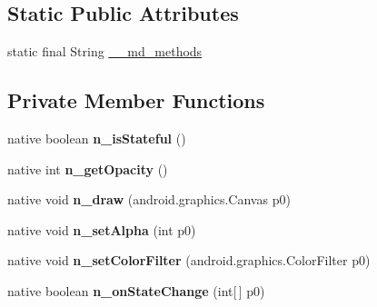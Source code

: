 \subsection*{Static Public Attributes}
\begin{DoxyCompactItemize}
\item 
static final String \hyperlink{classmd5b60ffeb829f638581ab2bb9b1a7f4f3f_1_1FrameRenderer__FrameDrawable_acfbbaabd3b64c552efa12d5d5b5d7e8b}{\+\_\+\+\_\+md\+\_\+methods}
\end{DoxyCompactItemize}
\subsection*{Private Member Functions}
\begin{DoxyCompactItemize}
\item 
\mbox{\label{classmd5b60ffeb829f638581ab2bb9b1a7f4f3f_1_1FrameRenderer__FrameDrawable_afa40caf99425490405ec90556304af17}} 
native boolean {\bfseries n\+\_\+is\+Stateful} ()
\item 
\mbox{\label{classmd5b60ffeb829f638581ab2bb9b1a7f4f3f_1_1FrameRenderer__FrameDrawable_a6ded555eac288e334acbceab35ef7b5d}} 
native int {\bfseries n\+\_\+get\+Opacity} ()
\item 
\mbox{\label{classmd5b60ffeb829f638581ab2bb9b1a7f4f3f_1_1FrameRenderer__FrameDrawable_ab47dfea8aa6042fe07f335c7bcfa6807}} 
native void {\bfseries n\+\_\+draw} (android.\+graphics.\+Canvas p0)
\item 
\mbox{\label{classmd5b60ffeb829f638581ab2bb9b1a7f4f3f_1_1FrameRenderer__FrameDrawable_a7c043666fbe2cd061179bcb3660fd0cc}} 
native void {\bfseries n\+\_\+set\+Alpha} (int p0)
\item 
\mbox{\label{classmd5b60ffeb829f638581ab2bb9b1a7f4f3f_1_1FrameRenderer__FrameDrawable_ab7bf917ac36adc14fbf1b7b2bd2de0dc}} 
native void {\bfseries n\+\_\+set\+Color\+Filter} (android.\+graphics.\+Color\+Filter p0)
\item 
\mbox{\label{classmd5b60ffeb829f638581ab2bb9b1a7f4f3f_1_1FrameRenderer__FrameDrawable_af1d15dd26004a6e67f7ebf00c4c613f8}} 
native boolean {\bfseries n\+\_\+on\+State\+Change} (int\mbox{[}$\,$\mbox{]} p0)
\end{DoxyCompactItemize}
